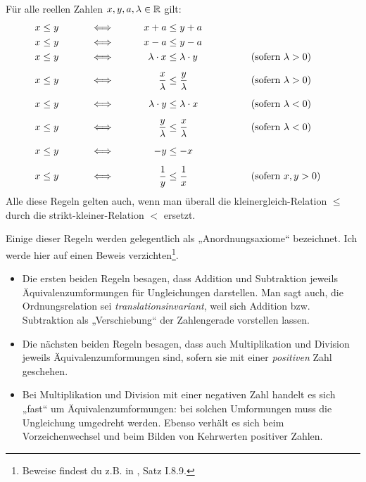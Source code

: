 \begin{satz} \label{ungleichungregeln}
    Für alle reellen Zahlen $x,y,a,\lambda\in \mathbb R$ gilt:
    \begingroup
    \allowdisplaybreaks
    \begin{alignat*}{4}
        x&\le y &\qquad&\iff&\qquad x+a&\le y+a \\
        x&\le y &\qquad&\iff&\qquad x-a&\le y-a \\
        x&\le y &\qquad&\iff&\qquad \lambda \cdot x&\le \lambda \cdot y &\qquad&\qquad (\textnormal{sofern $\lambda>0$}) \\[0.5em]
        x&\le y &\qquad&\iff&\qquad \frac{x}{\lambda} &\le \frac{y}{\lambda} &\qquad&\qquad (\textnormal{sofern $\lambda>0$}) \\[0.5em]
        x&\le y &\qquad&\iff&\qquad \lambda \cdot y&\le \lambda \cdot x &\qquad&\qquad (\textnormal{sofern $\lambda<0$}) \\[0.5em]
        x&\le y &\qquad&\iff&\qquad \frac{y}{\lambda} &\le \frac{x}{\lambda} &\qquad&\qquad (\textnormal{sofern $\lambda<0$}) \\[0.5em]
        x&\le y &\qquad &\iff&\qquad -y&\le -x \\[0.5em]
        x&\le y &\qquad&\iff&\qquad \frac{1}{y} & \le\frac{1}{x} &\qquad&\qquad (\textnormal{sofern $x,y>0$})
    \end{alignat*}
    \endgroup
    Alle diese Regeln gelten auch, wenn man überall die kleinergleich-Relation $\le$ durch die strikt-kleiner-Relation $<$ ersetzt.
\end{satz}


\begin{bem} \label{ungleichungerklaerung}
    Einige dieser Regeln werden gelegentlich als „Anordnungsaxiome“ bezeichnet. Ich werde hier auf einen Beweis verzichten\footnote{Beweise findest du z.B. in \cite{AE06}, Satz I.8.9.}.
    \begin{itemize}
        \item Die ersten beiden Regeln besagen, dass Addition und Subtraktion jeweils Äquivalenzumformungen für Ungleichungen darstellen. Man sagt auch, die Ordnungsrelation sei \emph{translationsinvariant}, weil sich Addition bzw. Subtraktion als „Verschiebung“ der Zahlengerade vorstellen lassen.
        \item Die nächsten beiden Regeln besagen, dass auch Multiplikation und Division jeweils Äquivalenzumformungen sind, sofern sie mit einer \emph{positiven} Zahl geschehen.
        \item Bei Multiplikation und Division mit einer negativen Zahl handelt es sich „fast“ um Äquivalenzumformungen: bei solchen Umformungen muss die Ungleichung umgedreht werden. Ebenso verhält es sich beim Vorzeichenwechsel und beim Bilden von Kehrwerten positiver Zahlen.
    \end{itemize}
\end{bem}


